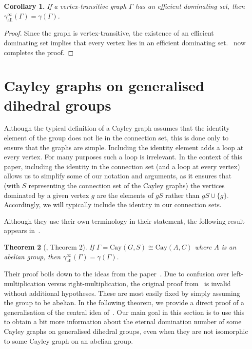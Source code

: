 \documentclass{amsart}
\newtheorem{thm}{Theorem}[section]
\newtheorem{cor}[thm]{Corollary}
\theoremstyle{remark}
\theoremstyle{definition}
\newcommand{\Cay}[2]{\mathrm{Cay}(#1,#2)}		%
\newcommand{\etdom}{\gamma_{\mathrm{all}}^\infty}
\begin{document}
\begin{cor}
    If a vertex-transitive graph $\Gamma$ has an efficient dominating set, then $\etdom(\Gamma)=\gamma(\Gamma)$.
\end{cor}

\begin{proof}
    Since the graph is vertex-transitive, the existence of an efficient dominating set implies that every vertex lies in an efficient dominating set.~ now completes the proof.
\end{proof}

\section{Cayley graphs on generalised dihedral groups}

Although the typical definition of a Cayley graph assumes that the identity element of the group does not lie in the connection set, this is done only to ensure that the graphs are simple. Including the identity element adds a loop at every vertex. For many purposes such a loop is irrelevant. In the context of this paper, including the identity in the connection set (and a loop at every vertex) allows us to simplify some of our notation and arguments, as it ensures that (with $S$ representing the connection set of the Cayley graphs) the vertices dominated by a given vertex $g$ are the elements of $gS$ rather than $gS \cup \{g\}$. Accordingly, we will typically include the identity in our connection sets.

Although they use their own terminology in their statement, the following result appears in~\cite{BSL2016}.

\begin{thm}[\cite{BSL2016}, Theorem 2]\label{like-abelian}
    If $\Gamma=\Cay{G}{S} \cong \Cay{A}{C}$ where $A$ is an abelian group, then $\etdom(\Gamma)=\gamma(\Gamma).$
\end{thm}

Their proof boils down to the ideas from the paper~\cite{GHH2005}.  Due to confusion over left-multiplication versus right-multiplication, the original proof from~\cite{GHH2005} is invalid without additional hypotheses. These are most easily fixed by simply assuming the group to be abelian. In the following theorem, we provide a direct proof of a generalisation of the central idea of~\cite{GHH2005}. Our main goal in this section is to use this to obtain a bit more information about the eternal domination number of some Cayley graphs on generalised dihedral groups, even when they are not isomorphic to some Cayley graph on an abelian group.
\end{document}
